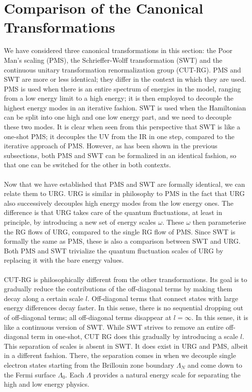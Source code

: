 \documentclass[twoside]{report}
\numberwithin{equation}{section}
\begin{document}
\section{Comparison of the Canonical Transformations}
We have considered three canonical transformations in this section: the Poor Man's scaling (PMS), the Schrieffer-Wolff transformation (SWT) and the continuous unitary transformation renormalization group (CUT-RG). PMS and SWT are more or less identical; they differ in the context in which they are used. PMS is used when there is an entire spectrum of energies in the model, ranging from a low energy limit to a high energy; it is then employed to decouple the highest energy modes in an iterative fashion. SWT is used when the Hamiltonian can be split into one high and one low energy part, and we need to decouple these two modes. It is clear when seen from this perspective that SWT is like a one-shot PMS; it decouples the UV from the IR in one step, compared to the iterative approach of PMS. However, as has been shown in the previous subsections, both PMS and SWT can be formalized in an identical fashion, so that one can be switched for the other in both contexts.
\\\\Now that we have established that PMS and SWT are formally identical, we can relate them to URG. URG is similar in philosophy to PMS in the fact that URG also successively decouples high energy modes from the low energy ones. The difference is that URG takes care of the quantum fluctuations, at least in principle, by introducing a new set of energy scales \(\omega\). These \(\omega\) then parameterise the RG flows of URG, compared to the single RG flow of PMS. Since SWT is formally the same as PMS, these is also a comparison between SWT and URG. Both PMS and SWT trivialize the quantum fluctuation scales of URG by replacing it with the bare energy values.
\\\\CUT-RG is philosophically different from the other transformations. Its goal is to gradually reduce the contributions of the off-diagonal terms by making them decay along a certain scale \(l\). Off-diagonal terms that connect states with large energy differences decay faster. In this sense, there is no sequential dropping out of off-diagonal terms; all off-diagonal terms disappear at \(l=\infty\). In this sense, it is like a continuous version of SWT. While SWT strives to remove an entire off-diagonal term in one-shot, CUT RG does this gradually by introducing a scale \(l\). This separation of scales is absent in SWT. It does exist in URG and PMS, albeit in a different fashion. There, the separation comes in when we decouple single electron states starting from the Brillouin zone boundary \(\Lambda_N\) and come down to the Fermi surface \(\Lambda_0\). Each \(\Lambda\) provides a natural energy scale for separating the high and low energy physics.
\end{document}
